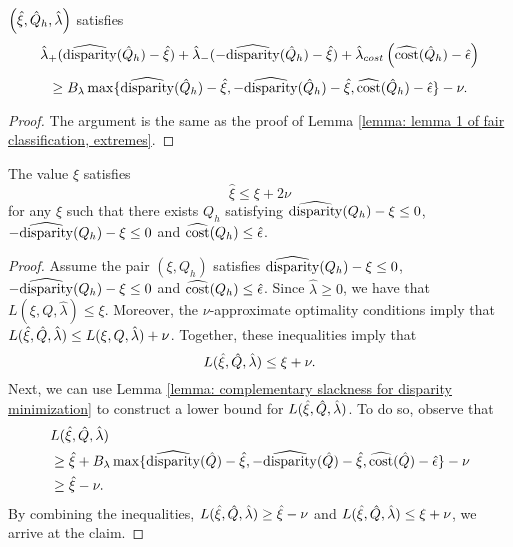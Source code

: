 \documentclass{article}
\begin{document}
\begin{lemma}\label{lemma: complementary slackness for disparity minimization} $\left( \hat{\xi}, \hat{Q}_h, \hat{\lambda} \right)$ satisfies
    \[
    \hat{\lambda}_{+} ( \widehat{\operatorname{disparity}}(\hat{Q}_h) - \hat{\xi} ) + \hat{\lambda}_{-} ( -\widehat{\operatorname{disparity}}(\hat{Q}_h) -\hat{\xi}) + \hat{\lambda}_{cost} \left( \widehat{\operatorname{cost}}(\hat{Q}_h) - \hat{\epsilon} \right)
    \]
    \[
    \geq B_{\lambda} \max\{ \widehat{\operatorname{disparity}}(\hat{Q}_h) - \hat{\xi}, -\widehat{\operatorname{disparity}}(\hat{Q}_h) -\hat{\xi}, \widehat{\operatorname{cost}}(\hat{Q}_h) - \hat{\epsilon}\} - \nu.
    \]
    \begin{proof}
        The argument is the same as the proof of Lemma \ref{lemma: lemma 1 of fair classification, extremes}.
    \end{proof}
\end{lemma}

\begin{lemma}\label{lemma: empirical slack variable bound for disparity minimization}
    The value $\hat{\xi}$ satisfies 
        \begin{equation*}
            \hat{\xi} \leq \xi + 2 \nu
        \end{equation*}
    for any $\xi$ such that there exists $Q_h$ satisfying $\widehat{\operatorname{disparity}}(Q_h) - \xi \leq 0$, $-\widehat{\operatorname{disparity}}(Q_h) - \xi \leq 0$ and $\widehat{\operatorname{cost}}(Q_h) \leq \hat{\epsilon}$.
    
    \begin{proof}
        Assume the pair $(\xi, Q_h)$ satisfies $\widehat{\operatorname{disparity}}(Q_h) - \xi \leq 0$, $-\widehat{\operatorname{disparity}}(Q_h) - \xi \leq 0$ and $\widehat{\operatorname{cost}}(Q_h) \leq \hat{\epsilon}$. Since $\hat{\lambda} \geq 0$, we have that $L(\xi, Q, \hat{\lambda}) \leq \xi$. Moreover, the $\nu$-approximate optimality conditions imply that $L(\hat \xi, \hat{Q}, \hat \lambda) \leq L(\xi, Q, \hat \lambda) + \nu$. Together, these inequalities imply that 
            \[
            L(\hat \xi, \hat{Q}, \hat \lambda) \leq \xi + \nu.
            \]
        Next, we can use Lemma \ref{lemma: complementary slackness for disparity minimization} to construct a lower bound for $L(\hat \xi, \hat{Q}, \hat \lambda)$. To do so, observe that 
            \begin{align*}
                & L(\hat \xi, \hat{Q}, \hat \lambda) \\
                &\geq \hat{\xi} + B_{\lambda} \max\{ \widehat{\operatorname{disparity}}(\hat{Q}) - \hat{\xi}, -\widehat{\operatorname{disparity}}(\hat{Q}) -\hat{\xi}, \widehat{\operatorname{cost}}(\hat{Q}) - \hat{\epsilon}\} - \nu \\
                &\geq \hat{\xi} - \nu.
            \end{align*}
        By combining the inequalities, $L(\hat \xi, \hat{Q}, \hat \lambda) \geq \hat{\xi} - \nu$ and $L(\hat \xi, \hat{Q}, \hat \lambda) \leq \xi + \nu$, we arrive at the claim.
    \end{proof}
\end{lemma}
\end{document}

